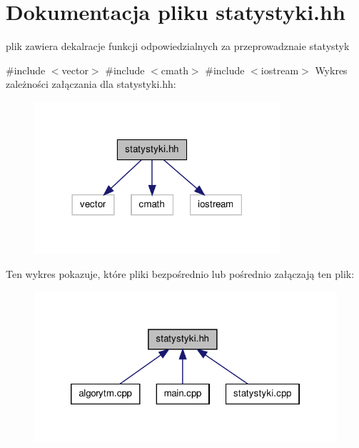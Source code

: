 \hypertarget{statystyki_8hh}{\section{\-Dokumentacja pliku statystyki.\-hh}
\label{statystyki_8hh}
}


plik zawiera dekalracje funkcji odpowiedzialnych za przeprowadznaie statystyk  


{\ttfamily \#include $<$vector$>$}\*
{\ttfamily \#include $<$cmath$>$}\*
{\ttfamily \#include $<$iostream$>$}\*
\-Wykres zależności załączania dla statystyki.\-hh\-:
\nopagebreak
\begin{figure}[H]
\begin{center}
\leavevmode
\includegraphics[width=258pt]{statystyki_8hh__incl}
\end{center}
\end{figure}
\-Ten wykres pokazuje, które pliki bezpośrednio lub pośrednio załączają ten plik\-:
\nopagebreak
\begin{figure}[H]
\begin{center}
\leavevmode
\includegraphics[width=322pt]{statystyki_8hh__dep__incl}
\end{center}
\end{figure}
